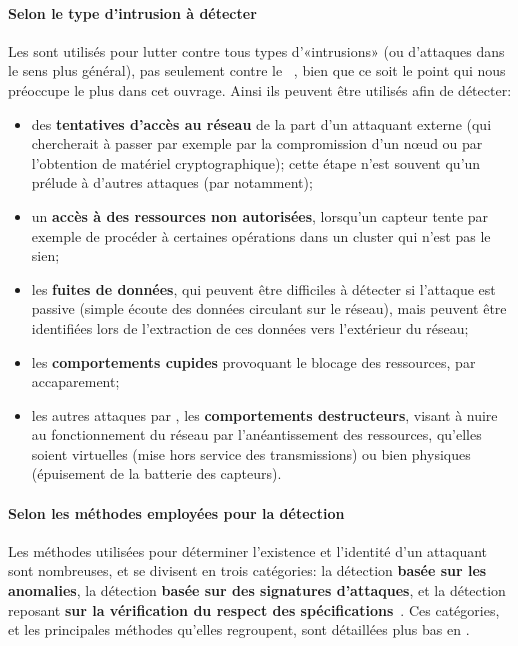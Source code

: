         \paragraph{Selon le type d'intrusion à détecter}
Les \IDS sont utilisés pour lutter contre tous types d'«intrusions» (ou d'attaques dans le sens plus général), pas seulement contre le \dds~\cite{BMS13}, bien que ce soit le point qui nous préoccupe le plus dans cet ouvrage.
Ainsi ils peuvent être utilisés afin de détecter:
\begin{itemize}
    \item des \textbf{tentatives d'accès au réseau} de la part d'un attaquant externe (qui chercherait à passer par exemple par la compromission d'un nœud ou par l'obtention de matériel cryptographique); cette étape n'est souvent qu'un prélude à d'autres attaques (par \dds notamment);
    \item un \textbf{accès à des ressources non autorisées}, lorsqu'un capteur tente par exemple de procéder à certaines opérations dans un cluster qui n'est pas le sien;
    \item les \textbf{fuites de données}, qui peuvent être difficiles à détecter si l'attaque est passive (simple écoute des données circulant sur le réseau), mais peuvent être identifiées lors de l'extraction de ces données vers l'extérieur du réseau;
    \item les \textbf{comportements cupides} provoquant le blocage des ressources, par accaparement;
    \item les autres attaques par \dds, \cad les \textbf{comportements destructeurs}, visant à nuire au fonctionnement du réseau par l'anéantissement des ressources, qu'elles soient virtuelles (mise hors service des transmissions) ou bien physiques (épuisement de la batterie des capteurs).
\end{itemize}

        \paragraph{Selon les méthodes employées pour la détection}
Les méthodes utilisées pour déterminer l'existence et l'identité d'un attaquant sont nombreuses, et se divisent en trois catégories: la détection \textbf{basée sur les anomalies}, la détection \textbf{basée sur des signatures d'attaques}, et la détection reposant \textbf{sur la vérification du respect des spécifications}~\cite{BMS13}.
Ces catégories, et les principales méthodes qu'elles regroupent, sont détaillées plus bas en .

